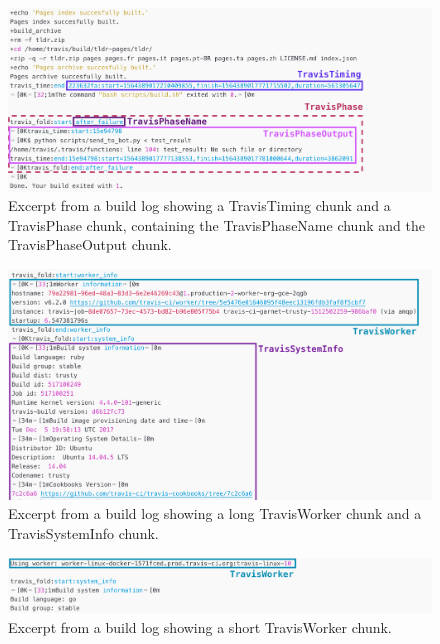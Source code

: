 \documentclass[\myrootdir/main.tex]{subfiles}
\begin{document}
\begin{figure}[htbp]
	\centering
	\includegraphics[width=\textwidth, clip]{img/log12.png}
	\caption{Excerpt from a build log showing a TravisTiming chunk and a TravisPhase chunk, containing the TravisPhaseName chunk and the TravisPhaseOutput chunk.}
	\label{fig:log-1}
\end{figure}
\begin{figure}[htbp]
	\centering
	\includegraphics[width=\textwidth, clip]{img/log02.png}
	\caption{Excerpt from a build log showing a long TravisWorker chunk and a TravisSystemInfo chunk.}
	\label{fig:log-0}
\end{figure}
\begin{figure}[htbp]
	\centering
	\includegraphics[width=\textwidth, clip]{img/log22.png}
	\caption{Excerpt from a build log showing a short TravisWorker chunk.}
	\label{fig:log-2}
\end{figure}
\end{document}
